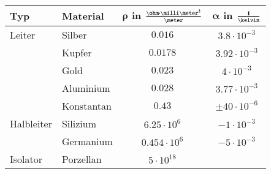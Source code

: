 \begin{center}
    \begin{tabular}{| l | l  c  c |}
        \toprule
        \textbf{Typ}        & \textbf{Material}     & $\bm{\rho}$ \textbf{in} $\bm{\frac{\ohm \cdot \milli \meter^2}{\meter}}$  & $\bm{\alpha}$ \textbf{in} $\bm{\frac{1}{\kelvin}}$    \\
        \midrule
        Leiter              & Silber                & $0.016$                                                                   & $3.8 \cdot 10^{-3}$                                   \\
        \midrule
                            & Kupfer                & $0.0178$                                                                  & $3.92 \cdot 10^{-3}$                                  \\
        \midrule            
                            & Gold                  & $0.023$                                                                   & $4 \cdot 10^{-3}$                                     \\
        \midrule            
                            & Aluminium             & $0.028$                                                                   & $3.77 \cdot 10^{-3}$                                  \\
        \midrule
                            & Konstantan            & $0.43$                                                                    & $\pm 40 \cdot 10^{-6}$                                \\  
        \midrule
        Halbleiter          & Silizium              & $6.25 \cdot 10^6$                                                         & $- 1 \cdot 10^{-3}$                                   \\
        \midrule
                            & Germanium             & $0.454 \cdot 10^6$                                                        & $- 5 \cdot 10^{-3}$                                   \\
        \midrule        
        Isolator            & Porzellan             & $5 \cdot 10^{18}$                                                         &                                                       \\
        \bottomrule               
    \end{tabular}
\end{center}